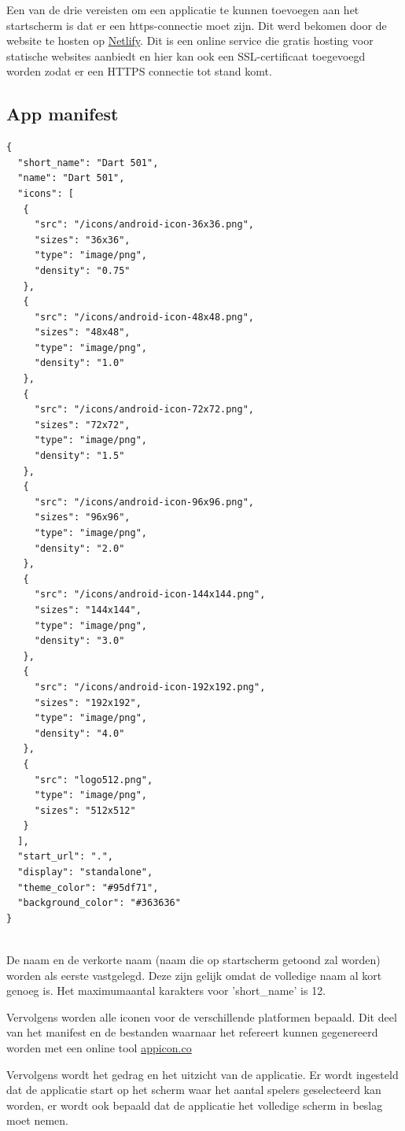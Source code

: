		Een van de drie vereisten om een applicatie te kunnen toevoegen aan het startscherm is dat er een https-connectie moet zijn. Dit werd bekomen door de website te hosten op \href{https://www.netlify.com/}{ Netlify}. Dit is een online service die gratis hosting voor statische websites aanbiedt en hier kan ook een SSL-certificaat toegevoegd worden zodat er een HTTPS connectie tot stand komt.


	\subsection{App manifest}
\begin{lstlisting}
{
  "short_name": "Dart 501",
  "name": "Dart 501",
  "icons": [
   {
     "src": "/icons/android-icon-36x36.png",
     "sizes": "36x36",
     "type": "image/png",
     "density": "0.75"
   },
   {
     "src": "/icons/android-icon-48x48.png",
     "sizes": "48x48",
     "type": "image/png",
     "density": "1.0"
   },
   {
     "src": "/icons/android-icon-72x72.png",
     "sizes": "72x72",
     "type": "image/png",
     "density": "1.5"
   },
   {
     "src": "/icons/android-icon-96x96.png",
     "sizes": "96x96",
     "type": "image/png",
     "density": "2.0"
   },
   {
     "src": "/icons/android-icon-144x144.png",
     "sizes": "144x144",
     "type": "image/png",
     "density": "3.0"
   },
   {
     "src": "/icons/android-icon-192x192.png",
     "sizes": "192x192",
     "type": "image/png",
     "density": "4.0"
   },
   {
     "src": "logo512.png",
     "type": "image/png",
     "sizes": "512x512"
   }
  ],
  "start_url": ".",
  "display": "standalone",
  "theme_color": "#95df71",
  "background_color": "#363636"
}
	
\end{lstlisting}
		
		De naam en de verkorte naam (naam die op startscherm getoond zal worden) worden als eerste vastgelegd. Deze zijn gelijk omdat de volledige naam al kort genoeg is. Het maximumaantal karakters voor 'short\_name' is 12.
 
		
		Vervolgens worden alle iconen voor de verschillende platformen bepaald. Dit deel van het manifest en de bestanden waarnaar het refereert kunnen gegenereerd worden met een online tool \href{https://appicon.co}{appicon.co}
		
		Vervolgens wordt het gedrag en het uitzicht van de applicatie. Er wordt ingesteld dat de applicatie start op het scherm waar het aantal spelers geselecteerd kan worden, er wordt ook bepaald dat de applicatie het volledige scherm in beslag moet nemen.
		
